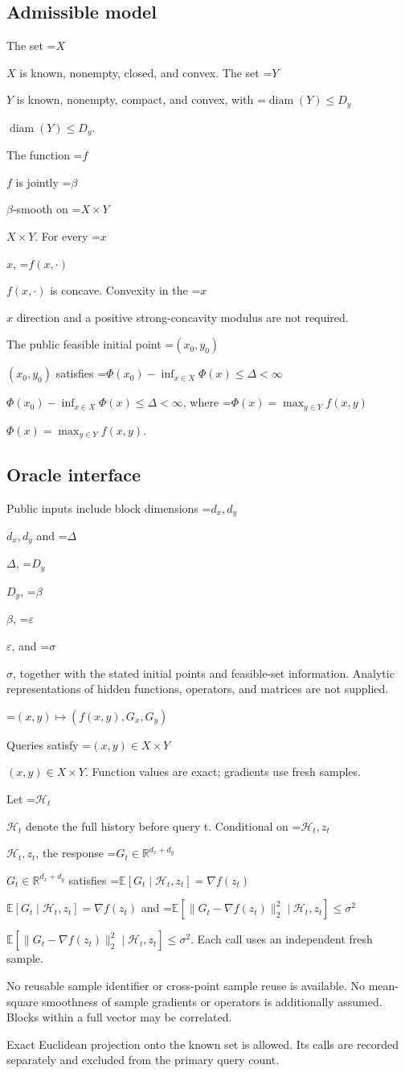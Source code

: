 \documentclass[10pt,a4paper]{article}
\newcommand{\AtlasMath}[1]{\par\begingroup\centering\setbox0=\hbox{$\displaystyle #1$}\ifdim\wd0>1.4\linewidth\typeout{ATLAS WIDE FORMULA: \the\wd0}\fi\ifdim\wd0>\linewidth\resizebox{\linewidth}{!}{\box0}\else\box0\fi\par\endgroup}
\newcommand{\AtlasInlineMath}[1]{\begingroup\setbox0=\hbox{$#1$}\ifdim\wd0>.4\linewidth\endgroup\AtlasMath{#1}\else\endgroup$#1$\fi}
\begin{document}
\subsection{Admissible model}
The set \AtlasInlineMath{X} is known, nonempty, closed, and convex. The set \AtlasInlineMath{Y} is known, nonempty, compact, and convex, with \AtlasInlineMath{\operatorname{diam}(Y)\le D_y}.

The function \AtlasInlineMath{f} is jointly \AtlasInlineMath{\beta}-smooth on \AtlasInlineMath{X\times Y}. For every \AtlasInlineMath{x}, \AtlasInlineMath{f(x,\cdot)} is concave. Convexity in the \AtlasInlineMath{x} direction and a positive strong-concavity modulus are not required.

The public feasible initial point \AtlasInlineMath{(x_0,y_0)} satisfies \AtlasInlineMath{\Phi(x_0)-\inf_{x\in X}\Phi(x)\le\Delta<\infty}, where \AtlasInlineMath{\Phi(x)=\max_{y\in Y}f(x,y)}.

\subsection{Oracle interface}
Public inputs include block dimensions \AtlasInlineMath{d_x,d_y} and \AtlasInlineMath{\Delta}, \AtlasInlineMath{D_y}, \AtlasInlineMath{\beta}, \AtlasInlineMath{\varepsilon}, and \AtlasInlineMath{\sigma}, together with the stated initial points and feasible-set information. Analytic representations of hidden functions, operators, and matrices are not supplied.


\AtlasMath{(x,y)\longmapsto(f(x,y),G_x,G_y)}


Queries satisfy \AtlasInlineMath{(x,y)\in X\times Y}. Function values are exact; gradients use fresh samples.

Let \AtlasInlineMath{\mathcal H_t} denote the full history before query t. Conditional on \AtlasInlineMath{\mathcal H_t,z_t}, the response \AtlasInlineMath{G_t\in\mathbb R^{d_x+d_y}} satisfies \AtlasInlineMath{\mathbb E[G_t\mid\mathcal H_t,z_t]=\nabla f(z_t)} and \AtlasInlineMath{\mathbb E[\|G_t-\nabla f(z_t)\|_2^2\mid\mathcal H_t,z_t]\le\sigma^2}. Each call uses an independent fresh sample.

No reusable sample identifier or cross-point sample reuse is available. No mean-square smoothness of sample gradients or operators is additionally assumed. Blocks within a full vector may be correlated.

Exact Euclidean projection onto the known set is allowed. Its calls are recorded separately and excluded from the primary query count.
\end{document}
